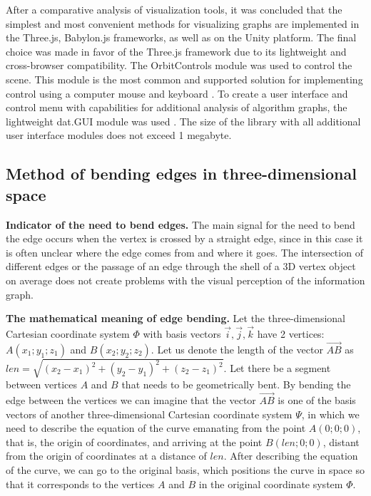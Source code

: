 After a comparative analysis of visualization tools, it was concluded that the simplest and most convenient methods for visualizing graphs are implemented in the Three.js, Babylon.js frameworks, as well as on the Unity platform. The final choice was made in favor of the Three.js framework due to its lightweight and cross-browser compatibility. The OrbitControls module was used to control the scene. This module is the most common and supported solution for implementing control using a computer mouse and keyboard \cite{m43}. To create a user interface and control menu with capabilities for additional analysis of algorithm graphs, the lightweight dat.GUI module was used \cite{m44}. The size of the library with all additional user interface modules does not exceed 1 megabyte.

\subsection{Method of bending edges in three-dimensional space}

\textbf{Indicator of the need to bend edges.} The main signal for the need to bend the edge occurs when the vertex is crossed by a straight edge, since in this case it is often unclear where the edge comes from and where it goes. The intersection of different edges or the passage of an edge through the shell of a 3D vertex object on average does not create problems with the visual perception of the information graph.

\textbf{The mathematical meaning of edge bending.}  Let the three-dimensional Cartesian coordinate system $\Phi$ with basis vectors $\overrightarrow{i}, \overrightarrow{j}, \overrightarrow{k}$ have 2 vertices: $A(x_1; y_1; z_1)$ and $B(x_2; y_2; z_2)$. Let us denote the length of the vector $\overrightarrow{AB}$ as $len = \sqrt{
(x_2 - x_1)^2 +
(y_2 - y_1)^2 +
(z_2 - z_1)^2 }$. Let there be a segment between vertices $A$ and $B$ that needs to be geometrically bent. By bending the edge between the vertices we can imagine that the vector $\overrightarrow{AB}$ is one of the basis vectors of another three-dimensional Cartesian coordinate system $\Psi$, in which we need to describe the equation of the curve emanating from the point $A(0; 0; 0)$, that is, the origin of coordinates, and arriving at the point $B\left(len; 0; 0 \right)$, distant from the origin of coordinates at a distance of $len$. After describing the equation of the curve, we can go to the original basis, which positions the curve in space so that it corresponds to the vertices  $A$ and $B$ in the original coordinate system $\Phi$.


